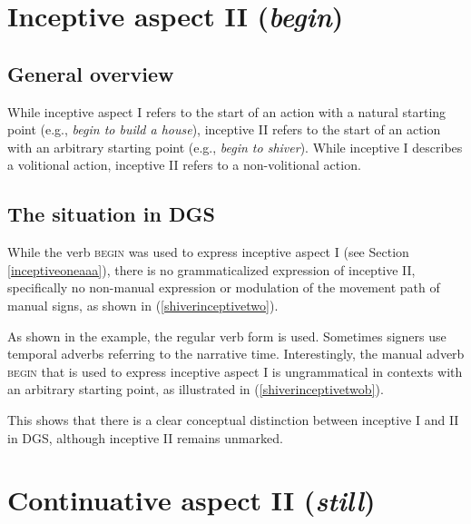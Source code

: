 

\section{Inceptive aspect II (\textit{begin})}\label{inceptivetwo}
\subsection{General overview}

While inceptive aspect I refers to the start of an action with a natural starting point (e.g., \textit{begin to build a house}), inceptive II refers to the start of an action with an arbitrary starting point (e.g., \textit{begin to shiver}). While inceptive I describes a volitional action, inceptive II refers to a non-volitional action.

\subsection{The situation in DGS}
While the verb \textsc{begin} was used to express inceptive aspect I (see Section \ref{inceptiveoneaaa}), there is no grammaticalized expression of inceptive II, specifically no non-manual expression or modulation of the movement path of manual signs, as shown in (\ref{shiverinceptivetwo}). 

\begin{exe}
\end{exe}

\noindent As shown in the example, the regular verb form is used. Sometimes signers use temporal adverbs referring to the narrative time. Interestingly, the manual adverb \textsc{begin} that is used to express inceptive aspect I is ungrammatical in contexts with an arbitrary starting point, as illustrated in (\ref{shiverinceptivetwob}). 

\begin{exe}
\end{exe}

\noindent This shows that there is a clear conceptual distinction between inceptive I and II in DGS, although inceptive II remains unmarked. 




\section{Continuative aspect II (\textit{still})}\label{continuativetwo}
